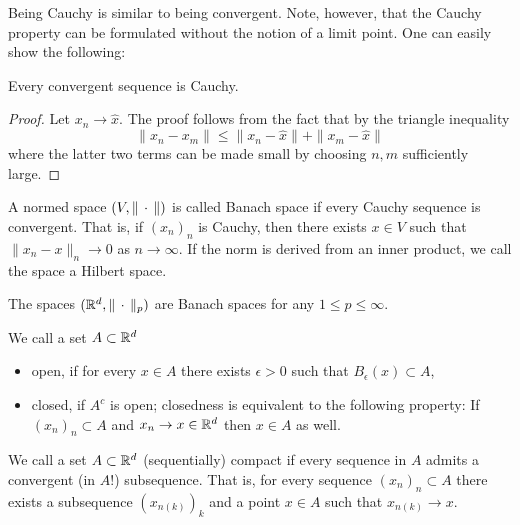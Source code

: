 Being Cauchy is similar to being convergent. Note, however, that the Cauchy property can be formulated without the notion of a limit point. One can easily show the following:

\begin{theorem}
    Every convergent sequence is Cauchy.
\end{theorem}
\begin{proof}
    Let $x_n\rightarrow\hat x$. The proof follows from the fact that by the triangle inequality
    \begin{equation}
        \|x_n-x_m\|\leq \|x_n-\hat x\| + \|x_m - \hat x\|
    \end{equation}
    where the latter two terms can be made small by choosing $n,m$ sufficiently large.
\end{proof}

\begin{defn}
    A normed space $(V,\|\,\cdot\,\|)$ is called Banach space if every Cauchy sequence is convergent. That is, if $(x_n)_n$ is Cauchy, then there exists $x\in V$ such that $\|x_n-x\|_n\rightarrow 0$ as $n\rightarrow \infty$. If the norm is derived from an inner product, we call the space a Hilbert space.
\end{defn}

\begin{example}
    The spaces $(\mathbb{R}^d,\|\,\cdot\,\|_p)$ are Banach spaces for any $1\leq p\leq \infty$.
\end{example}

\begin{defn}
    We call a set $A\subset\mathbb{R}^d$ 
    \begin{itemize}
        \item open, if for every $x\in A$ there exists $\epsilon>0$ such that $B_\epsilon (x)\subset A$,
        \item closed, if $A^c$ is open; closedness is equivalent to the following property: If $(x_n)_n\subset A$ and $x_n\rightarrow x\in\mathbb{R}^d$ then $x\in A$ as well.
    \end{itemize}
\end{defn}

\begin{defn}
    We call a set $A\subset \mathbb{R}^d$ (sequentially) compact if every sequence in $A$ admits a convergent (in $A$!) subsequence. That is, for every sequence $(x_n)_n\subset A$ there exists a subsequence $(x_{n(k)})_k$ and a point $x\in A$ such that $x_{n(k)}\rightarrow x$.
\end{defn}

